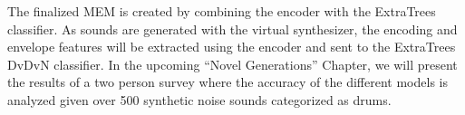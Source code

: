 \documentclass[\main/thesis.tex]{subfiles}
\begin{document}
The finalized MEM is created by combining the encoder with the ExtraTrees classifier. As sounds are generated with the virtual synthesizer, the encoding and envelope features will be extracted using the encoder and sent to the ExtraTrees DvDvN classifier. In the upcoming \enquote{Novel Generations} Chapter, we will present the results of a two person survey where the accuracy of the different models is analyzed given over 500 synthetic noise sounds categorized as drums. 









    


\end{document}
